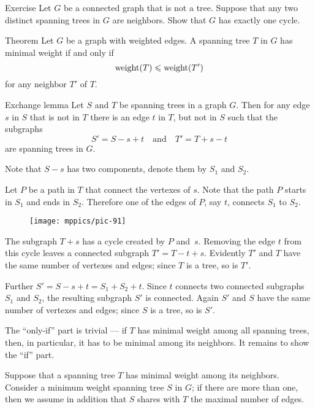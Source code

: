 \begin{thm}{Exercise}
Let $G$ be a connected graph that is not a tree.
Suppose that any two distinct spanning trees in $G$ are neighbors.
Show that $G$ has exactly one cycle.
\end{thm}

\begin{thm}{Theorem}\label{thm:mst-iff}
Let $G$ be a graph with weighted edges.
A spanning tree $T$ in $G$ has minimal weight if and only if
\[\mathop{\rm weight}\nolimits(T)\leqslant \mathop{\rm weight}\nolimits(T')\]
for any neighbor $T'$ of $T$.
\end{thm}

\begin{thm}{Exchange lemma}
Let $S$ and $T$ be spanning trees in a graph $G$.
Then for any edge $s$ in $S$ that is not in $T$ there is an edge $t$ in $T$, but not in $S$ such that the subgraphs
\[S'=S-s+t\quad\text{and}\quad T'=T+s-t\]
are spanning trees in $G$.
\end{thm}

Note that $S-s$ has two components, denote them by $S_1$ and $S_2$.

Let $P$ be a path in $T$ that connect the vertexes of $s$.
Note that the path $P$ starts in $S_1$ and ends in $S_2$.
Therefore one of the edges of $P$, say $t$, connects $S_1$ to $S_2$.

\begin{figure}[h!]
\vskip-0mm
\centering
\texttt{[image: mppics/pic-91]}
\end{figure}

The subgraph $T+s$ has a cycle created by $P$ and~$s$.
Removing the edge $t$ from this cycle leaves a connected subgraph $T'=T-t+s$.
Evidently $T'$ and $T$ have the same number of vertexes and edges;
since $T$ is a tree, so is $T'$.

Further $S'=S-s+t=S_1+S_2+t$.
Since $t$ connects two connected subgraphs $S_1$ and $S_2$, the resulting subgraph $S'$ is connected.
Again $S'$ and $S$ have the same number of vertexes and edges;
since $S$ is a tree, so is $S'$.
\qeds

 The ``only-if'' part is trivial --- if $T$ has minimal weight among all spanning trees, then, in particular, it has to be minimal among its neighbors. 
It remains to show the ``if'' part.

Suppose that a spanning tree $T$ has minimal weight among its neighbors.
Consider a minimum weight spanning tree $S$ in $G$;
if there are more than one, then
we assume in addition that $S$ shares with $T$ the maximal number of edges. 

